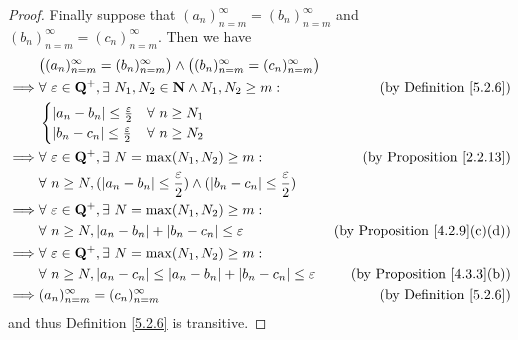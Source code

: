 \begin{proof}
    Finally suppose that \((a_n)_{n = m}^\infty = (b_n)_{n = m}^\infty\) and \((b_n)_{n = m}^\infty = (c_n)_{n = m}^\infty\).
    Then we have
    \begin{align*}
                 & \big((a_n)_{n = m}^\infty = (b_n)_{n = m}^\infty\big) \land \big((b_n)_{n = m}^\infty = (c_n)_{n = m}^\infty\big)                                                \\
        \implies & \forall\ \varepsilon \in \mathbf{Q}^+, \exists\ N_1, N_2 \in \mathbf{N} \land N_1, N_2 \geq m:                       & \text{(by Definition \ref{5.2.6})}        \\
                 & \begin{cases}
            \abs*{a_n - b_n} \leq \frac{\varepsilon}{2} & \forall\ n \geq N_1 \\
            \abs*{b_n - c_n} \leq \frac{\varepsilon}{2} & \forall\ n \geq N_2 \\
        \end{cases}                                                                                                                                        \\
        \implies & \forall\ \varepsilon \in \mathbf{Q}^+, \exists\ N = \max(N_1, N_2) \geq m:                                           & \text{(by Proposition \ref{2.2.13})}      \\
                 & \forall\ n \geq N, (\abs*{a_n - b_n} \leq \frac{\varepsilon}{2}) \land (\abs*{b_n - c_n} \leq \frac{\varepsilon}{2})                                             \\
        \implies & \forall\ \varepsilon \in \mathbf{Q}^+, \exists\ N = \max(N_1, N_2) \geq m:                                                                                       \\
                 & \forall\ n \geq N, \abs*{a_n - b_n} + \abs*{b_n - c_n} \leq \varepsilon                                              & \text{(by Proposition \ref{4.2.9}(c)(d))} \\
        \implies & \forall\ \varepsilon \in \mathbf{Q}^+, \exists\ N = \max(N_1, N_2) \geq m:                                                                                       \\
                 & \forall\ n \geq N, \abs*{a_n - c_n} \leq \abs*{a_n - b_n} + \abs*{b_n - c_n} \leq \varepsilon                        & \text{(by Proposition \ref{4.3.3}(b))}    \\
        \implies & (a_n)_{n = m}^\infty = (c_n)_{n = m}^\infty                                                                          & \text{(by Definition \ref{5.2.6})}
    \end{align*}
    and thus Definition \ref{5.2.6} is transitive.
\end{proof}

